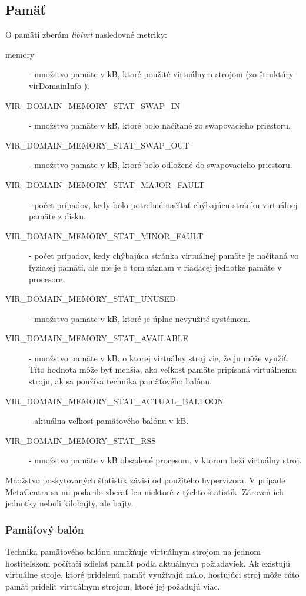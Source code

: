 \documentclass[printed,11pt,twoside,color,cover,table]{fithesis3}
\begin{document}
\subsection{Pamäť}
O pamäti zberám \textit{libivrt} nasledovné metriky:
\begin{description}
\item[memory] - množstvo pamäte v kB, ktoré použité virtuálnym strojom (zo štruktúry virDomainInfo \cite{libvirt-domain-info}).
\item[VIR\_DOMAIN\_MEMORY\_STAT\_SWAP\_IN] - množstvo pamäte v kB, ktoré bolo načítané zo swapovacieho priestoru.
\item[VIR\_DOMAIN\_MEMORY\_STAT\_SWAP\_OUT] - množstvo pamäte v kB, ktoré bolo odložené do swapovacieho priestoru.
\item[VIR\_DOMAIN\_MEMORY\_STAT\_MAJOR\_FAULT] - počet prípadov, kedy bolo potrebné načítať chýbajúcu stránku virtuálnej pamäte z disku.
\item[VIR\_DOMAIN\_MEMORY\_STAT\_MINOR\_FAULT] - počet prípadov, kedy chýbajúca stránka virtuálnej pamäte je načítaná vo fyzickej pamäti, ale nie je o tom záznam v riadacej jednotke pamäte v procesore.
\item[VIR\_DOMAIN\_MEMORY\_STAT\_UNUSED] - množstvo pamäte v kB, ktoré je úplne nevyužité systémom.
\item[VIR\_DOMAIN\_MEMORY\_STAT\_AVAILABLE] - množstvo pamäte v kB, o ktorej virtuálny stroj vie, že ju môže využiť. Títo hodnota môže byť menšia, ako veľkosť pamäte pripísaná virtuálnemu stroju, 
ak sa používa technika pamäťového balónu.
\item[VIR\_DOMAIN\_MEMORY\_STAT\_ACTUAL\_BALLOON] - aktuálna veľkosť pamäťového balónu v kB.
\item[VIR\_DOMAIN\_MEMORY\_STAT\_RSS] - množstvo pamäte v kB obsadené procesom, v ktorom beží virtuálny stroj.
\cite{libvirt-mem}
\end{description}
Množstvo poskytovaných štatistík závisí od použitého hypervízora. V prípade MetaCentra sa mi podarilo zberať len niektoré z týchto štatistík. Zároveň ich jednotky neboli kilobajty, ale bajty.

\subsubsection{Pamäťový balón}
Technika pamäťového balónu umožňuje virtuálnym strojom na jednom hostiteľskom počítači zdieľať pamäť podľa aktuálnych požiadaviek. Ak existujú virtuálne stroje, ktoré pridelenú pamäť využívajú málo,
hosťujúci stroj môže túto pamäť prideliť virtuálnym strojom, ktoré jej požadujú viac.
\end{document}
